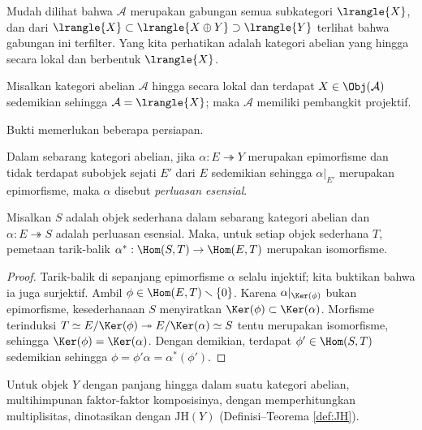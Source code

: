 Mudah dilihat bahwa $\mathcal{A}$ merupakan gabungan semua subkategori $\lrangle{X}$, dan dari $\lrangle{X} \subset \lrangle{X \oplus Y} \supset \lrangle{Y}$ terlihat bahwa gabungan ini terfilter. Yang kita perhatikan adalah kategori abelian yang hingga secara lokal dan berbentuk $\lrangle{X}$.

\begin{proposition}[O.\ Gabber]\label{prop:subcat-union}
	Misalkan kategori abelian $\mathcal{A}$ hingga secara lokal dan terdapat $X \in \Obj(\mathcal{A})$ sedemikian sehingga $\mathcal{A} = \lrangle{X}$; maka $\mathcal{A}$ memiliki pembangkit projektif.
\end{proposition}

Bukti memerlukan beberapa persiapan.

\begin{definition}
	Dalam sebarang kategori abelian, jika $\alpha: E \twoheadrightarrow Y$ merupakan epimorfisme dan tidak terdapat subobjek sejati $E'$ dari $E$ sedemikian sehingga $\alpha|_{E'}$ merupakan epimorfisme, maka $\alpha$ disebut \emph{perluasan esensial}.
\end{definition}

\begin{lemma}\label{prop:essential-ext-aux0}
	Misalkan $S$ adalah objek sederhana dalam sebarang kategori abelian dan $\alpha: E \twoheadrightarrow S$ adalah perluasan esensial. Maka, untuk setiap objek sederhana $T$, pemetaan tarik-balik $\alpha^*: \Hom(S, T) \to \Hom(E, T)$ merupakan isomorfisme.
\end{lemma}
\begin{proof}
	Tarik-balik di sepanjang epimorfisme $\alpha$ selalu injektif; kita buktikan bahwa ia juga surjektif. Ambil $\phi \in \Hom(E, T) \smallsetminus \{0\}$. Karena $\alpha|_{\Ker(\phi)}$ bukan epimorfisme, kesederhanaan $S$ menyiratkan $\Ker(\phi) \subset \Ker(\alpha)$. Morfisme terinduksi $T \simeq E/\Ker(\phi) \twoheadrightarrow E/\Ker(\alpha) \simeq S$ tentu merupakan isomorfisme, sehingga $\Ker(\phi) = \Ker(\alpha)$. Dengan demikian, terdapat $\phi' \in \Hom(S, T)$ sedemikian sehingga $\phi = \phi' \alpha = \alpha^*(\phi')$.
\end{proof}

Untuk objek $Y$ dengan panjang hingga dalam suatu kategori abelian, multihimpunan faktor-faktor komposisinya, dengan memperhitungkan multiplisitas, dinotasikan dengan $\mathrm{JH}(Y)$ (Definisi--Teorema \ref{def:JH}).

